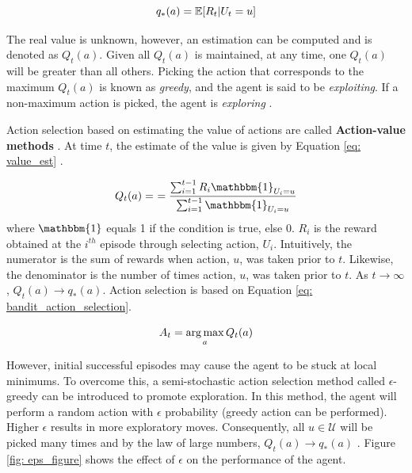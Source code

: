 \begin{equation}
    \centering
    q_*(a) = \mathbb{E}[R_t | U_t = u]
    \label{eq: value}
\end{equation}

The real value is unknown, however, an estimation can be computed and is denoted as $Q_t(a)$.  Given all $Q_t(a)$ is maintained, at any time, one $Q_t(a)$ will be greater than all others.  Picking the action that corresponds to the maximum $Q_t(a)$ is known as \textit{greedy}, and the agent is said to be \textit{exploiting}.  If a non-maximum action is picked, the agent is \textit{exploring} \cite{sutton}.

Action selection based on estimating the value of actions are called \textbf{Action-value methods} \cite{action_value_method}.  At time $t$, the estimate of the value is given by Equation \ref{eq: value_est} \cite{sutton}.

\begin{equation}
    \centering
    Q_t(a) = \
    = \frac{\sum_{i=1}^{t - 1} R_i \mathbbm{1}_{U_i=u}}
    {\sum_{i = 1}^{t - 1} \mathbbm{1}_{U_i = u}}
    \label{eq: value_est}
\end{equation}
where $\mathbbm{1}$ equals 1 if the condition is true, else 0.  $R_i$ is the reward obtained at the $i^{th}$ episode through selecting action, $U_i$.  Intuitively, the numerator is the sum of rewards when action, $u$, was taken prior to $t$.  Likewise, the denominator is the number of times action, $u$, was taken prior to $t$. As $t \rightarrow \infty$, $Q_t(a) \rightarrow q_*(a)$.  Action selection is based on Equation \ref{eq: bandit_action_selection}.

\begin{equation}
    \centering
    A_t = \argmax_a Q_t(a)
    \label{eq: bandit_action_selection}
\end{equation}

However, initial successful episodes may cause the agent to be stuck at local minimums. To overcome this, a semi-stochastic action selection method called $\epsilon$-greedy can be introduced to promote exploration. In this method, the agent will perform a random action with $\epsilon$ probability (greedy action can be performed).  Higher $\epsilon$ results in more exploratory moves.  Consequently, all $u \in \mathcal{U}$ will be picked many times and by the law of large numbers, $Q_t(a) \rightarrow q_*(a)$ \cite{large_numbers}. Figure \ref{fig: eps_figure} shows the effect of $\epsilon$ on the performance of the agent.

